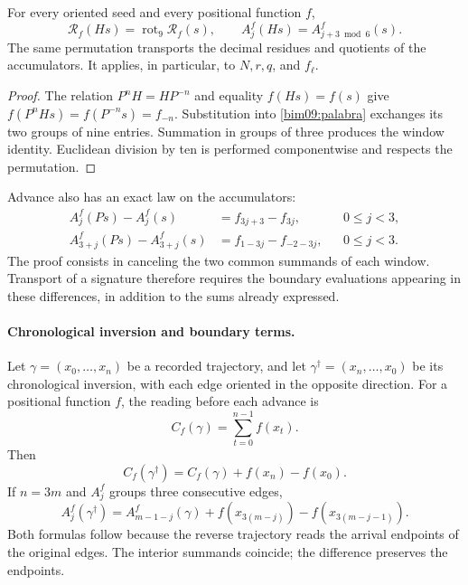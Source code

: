 \begin{proposition}
\label{bim09:media-vuelta}
For every oriented seed and every positional function $f$,
\[
 \mathcal R_f(Hs)=\operatorname{rot}_9\mathcal R_f(s),\qquad
 A_j^f(Hs)=A_{j+3\bmod6}^f(s).
\]
The same permutation transports the decimal residues and quotients
of the accumulators. It applies, in particular, to $N,r,q$, and $f_\ell$.
\end{proposition}
\begin{proof}
The relation $P^nH=HP^{-n}$ and equality $f(Hs)=f(s)$ give
$f(P^nHs)=f(P^{-n}s)=f_{-n}$. Substitution into
\eqref{bim09:palabra} exchanges its two groups of nine entries.
Summation in groups of three produces the window identity. Euclidean
division by ten is performed componentwise and respects the
permutation.
\end{proof}

Advance also has an exact law on the accumulators:
\begin{align}
 A_j^f(Ps)-A_j^f(s)&=f_{3j+3}-f_{3j},&&0\leq j<3,
 \label{bim09:avance-ida}\\
 A_{3+j}^f(Ps)-A_{3+j}^f(s)&=f_{1-3j}-f_{-2-3j},&&0\leq j<3.
 \label{bim09:avance-vuelta}
\end{align}
The proof consists in canceling the two common summands of each window.
Transport of a signature therefore requires the boundary evaluations
appearing in these differences, in addition to the sums already
expressed.

\paragraph{Chronological inversion and boundary terms.}

Let $\gamma=(x_0,\ldots,x_n)$ be a recorded trajectory, and let
$\gamma^\dagger=(x_n,\ldots,x_0)$ be its chronological inversion, with each
edge oriented in the opposite direction. For a positional function $f$,
the reading before each advance is
\[
 C_f(\gamma)=\sum_{t=0}^{n-1}f(x_t).
\]
Then
\begin{equation}
 C_f(\gamma^\dagger)=C_f(\gamma)+f(x_n)-f(x_0).
 \label{bim09:frontera-inversion}
\end{equation}
If $n=3m$ and $A_j^f$ groups three consecutive edges,
\begin{equation}
 A_j^f(\gamma^\dagger)=A_{m-1-j}^f(\gamma)
 +f(x_{3(m-j)})-f(x_{3(m-j-1)}).
 \label{bim09:frontera-ventana}
\end{equation}
Both formulas follow because the reverse trajectory reads the arrival
endpoints of the original edges. The interior summands coincide;
the difference preserves the endpoints.

